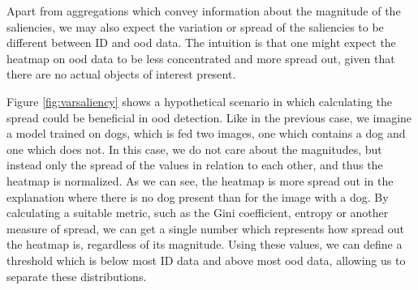 \documentclass[UKenglish]{uiomasterthesis} %
\theoremstyle{definition}
\begin{document}
Apart from aggregations which convey information about the magnitude of the saliencies, we may also expect the variation or spread of the saliencies to be different between ID and \ac{ood} data. The intuition is that one might expect the heatmap on \ac{ood} data to be less concentrated and more spread out, given that there are no actual objects of interest present.

Figure \ref{fig:varsaliency} shows a hypothetical scenario in which calculating the spread could be beneficial in \ac{ood} detection. Like in the previous case, we imagine a model trained on dogs, which is fed two images, one which contains a dog and one which does not. In this case, we do not care about the magnitudes, but instead only the spread of the values in relation to each other, and thus the heatmap is normalized. As we can see, the heatmap is more spread out in the explanation where there is no dog present than for the image with a dog. By calculating a suitable metric, such as the Gini coefficient, entropy or another measure of spread, we can get a single number which represents how spread out the heatmap is, regardless of its magnitude. Using these values, we can define a threshold which is below most ID data and above most \ac{ood} data, allowing us to separate these distributions.
\end{document}
